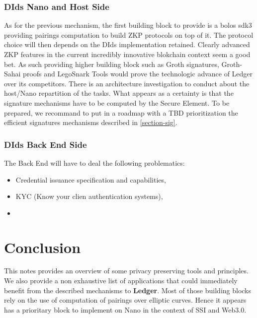 \documentclass[11pt]{llncs2e/llncs}
\begin{document}
\subsubsection{DIds Nano and Host Side}

As for the previous mechanism, the first building block to provide is a bolos sdk3 providing pairings computation to build ZKP protocols on top of it. The protocol choice will then depends on the DIds implementation retained. Clearly advanced ZKP features in the current incredibly innovative blokchain context seem a good bet. As such providing higher building block such as Groth signatures, Groth-Sahai proofs and LegoSnark Tools would prove the technologic advance of Ledger over its competitors. There is an architecture investigation to conduct about the host/Nano repartition of the tasks. What appears as a certainty is that the signature mechanisms have to be computed by the Secure Element. To be prepared, we recommand to put in a roadmap with a TBD prioritization the efficient signatures mechanisms described in \ref{section-sig}.



\subsubsection{DIds Back End Side}

The Back End will have to deal the following problematics:
\begin{itemize}
 \item Credential issuance specification and capabilities,
 \item KYC (Know your clien authentication systems),
 \item 
\end{itemize}


\section{Conclusion} 

This notes provides an overview of some privacy preserving tools and principles. We also provide a non exhaustive list of applications that could immediately benefit from the described mechanisms to {\bf \textregistered Ledger}. Most of those building blocks rely on the use of computation of pairings over elliptic curves. Hence it appears has a prioritary block to implement on Nano in the context of SSI and Web3.0. 
\end{document}
